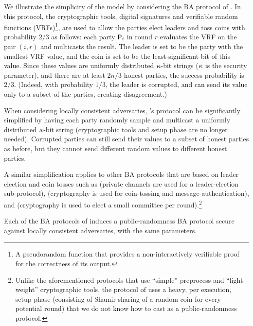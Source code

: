 We illustrate the simplicity of the model by considering the BA protocol of \citet{Micali17}. In this protocol, the  cryptographic tools, digital signatures and verifiable random functions (VRFs)\footnote{A pseudorandom function that provides a non-interactively verifiable proof for the correctness of its output.}, are used to allow the parties elect leaders and toss coins with probability $2/3$ as follows: each party $\mathsf{P}_i$ in round $r$ evaluates the VRF on the pair $(i,r)$ and multicasts the result. The leader is set to be the party with the smallest VRF value, and the coin is set to be the least-significant bit of this value. Since these values are uniformly distributed $\kappa$-bit strings ($\kappa$ is the security parameter), and there are at least $2n/3$ honest parties, the success probability is $2/3$. (Indeed, with probability $1/3$, the leader is corrupted, and can send its
value only to a subset of the parties, creating disagreement.)

When considering locally consistent adversaries, \citeauthor{Micali17}'s protocol can be significantly simplified by having each party randomly sample and multicast a uniformly distributed $\kappa$-bit string (cryptographic tools and setup phase are no longer needed). Corrupted parties can still send their values to a subset of honest parties as before, but they cannot send different random values to different honest parties.

A similar simplification applies to other BA protocols that are based on leader election and coin tosses such as \cite{FM97,FG03,KK06} (private channels are used for a leader-election sub-protocol), \cite{MV17,ADDNR19} (cryptography is used for coin-tossing and message-authentication), and \cite{SM16,ACDNPRS19} (cryptography is used to elect a small committee per round).\footnote{Unlike the aforementioned protocols that use ``simple'' preprocess and ``light-weight''  cryptographic tools, the protocol of \citet{Rabin83} uses a heavy, per execution, setup phase (consisting of Shamir sharing of a random coin for every potential round) that we do not know how to  cast as a public-randomness protocol.}

\begin{proposition}
Each of the BA protocols of \cite{FM97,FG03,KK06,Micali17,SM16,MV17,ADDNR19,ACDNPRS19} induces a public-randomness BA protocol secure against locally consistent adversaries, with the same parameters.
\end{proposition}


